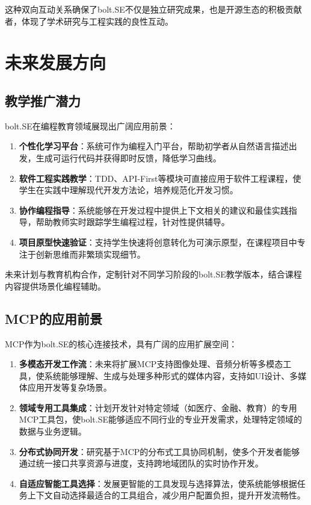 这种双向互动关系确保了bolt.SE不仅是独立研究成果，也是开源生态的积极贡献者，体现了学术研究与工程实践的良性互动。

\section{未来发展方向}

\subsection{教学推广潜力}

bolt.SE在编程教育领域展现出广阔应用前景：

\begin{enumerate}
  \item \textbf{个性化学习平台}：系统可作为编程入门平台，帮助初学者从自然语言描述出发，生成可运行代码并获得即时反馈，降低学习曲线。
  
  \item \textbf{软件工程实践教学}：TDD、API-First等模块可直接应用于软件工程课程，使学生在实践中理解现代开发方法论，培养规范化开发习惯。
  
  \item \textbf{协作编程指导}：系统能够在开发过程中提供上下文相关的建议和最佳实践指导，帮助教师实时跟踪学生编程过程，针对性提供辅导。
  
  \item \textbf{项目原型快速验证}：支持学生快速将创意转化为可演示原型，在课程项目中专注于创新思维而非繁琐实现细节。
\end{enumerate}

未来计划与教育机构合作，定制针对不同学习阶段的bolt.SE教学版本，结合课程内容提供场景化编程辅助。

\subsection{MCP的应用前景}

MCP作为bolt.SE的核心连接技术，具有广阔的应用扩展空间：

\begin{enumerate}
  \item \textbf{多模态开发工作流}：未来将扩展MCP支持图像处理、音频分析等多模态工具，使系统能够理解、生成与处理多种形式的媒体内容，支持如UI设计、多媒体应用开发等复杂场景。
  
  \item \textbf{领域专用工具集成}：计划开发针对特定领域（如医疗、金融、教育）的专用MCP工具包，使bolt.SE能够适应不同行业的专业开发需求，处理特定领域的数据与业务逻辑。
  
  \item \textbf{分布式协同开发}：研究基于MCP的分布式工具协同机制，使多个开发者能够通过统一接口共享资源与进度，支持跨地域团队的实时协作开发。
  
  \item \textbf{自适应智能工具选择}：发展更智能的工具发现与选择算法，使系统能够根据任务上下文自动选择最适合的工具组合，减少用户配置负担，提升开发流畅性。
\end{enumerate}

